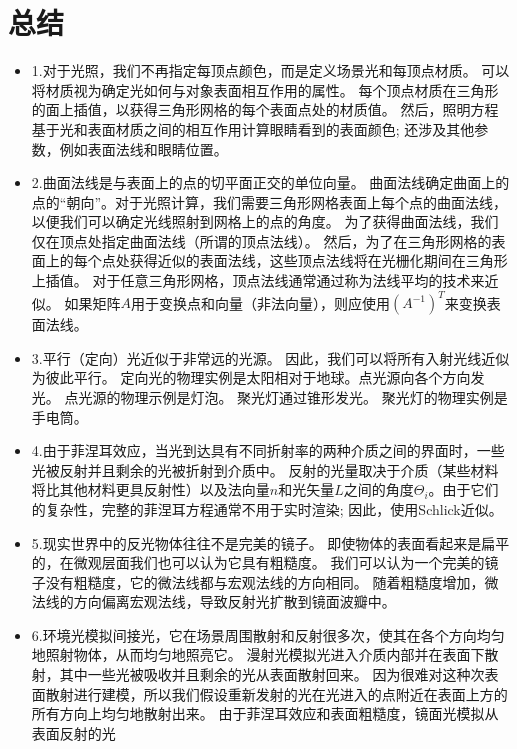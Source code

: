 \section{总结}
\begin{itemize}
  \item 1.对于光照，我们不再指定每顶点颜色，而是定义场景光和每顶点材质。 可以将材质视为确定光如何与对象表面相互作用的属性。 每个顶点材质在三角形的面上插值，以获得三角形网格的每个表面点处的材质值。 然后，照明方程基于光和表面材质之间的相互作用计算眼睛看到的表面颜色; 还涉及其他参数，例如表面法线和眼睛位置。
  \item 2.曲面法线是与表面上的点的切平面正交的单位向量。 曲面法线确定曲面上的点的“朝向”。对于光照计算，我们需要三角形网格表面上每个点的曲面法线，以便我们可以确定光线照射到网格上的点的角度。 为了获得曲面法线，我们仅在顶点处指定曲面法线（所谓的顶点法线）。 然后，为了在三角形网格的表面上的每个点处获得近似的表面法线，这些顶点法线将在光栅化期间在三角形上插值。 对于任意三角形网格，顶点法线通常通过称为法线平均的技术来近似。 如果矩阵$A$用于变换点和向量（非法向量），则应使用$(A^{-1})^{T}$来变换表面法线。
  \item 3.平行（定向）光近似于非常远的光源。 因此，我们可以将所有入射光线近似为彼此平行。 定向光的物理实例是太阳相对于地球。点光源向各个方向发光。 点光源的物理示例是灯泡。 聚光灯通过锥形发光。 聚光灯的物理实例是手电筒。
  \item 4.由于菲涅耳效应，当光到达具有不同折射率的两种介质之间的界面时，一些光被反射并且剩余的光被折射到介质中。 反射的光量取决于介质（某些材料将比其他材料更具反射性）以及法向量$n$和光矢量$L$之间的角度$\Theta_{i}$。由于它们的复杂性，完整的菲涅耳方程通常不用于实时渲染; 因此，使用Schlick近似。
  \item 5.现实世界中的反光物体往往不是完美的镜子。 即使物体的表面看起来是扁平的，在微观层面我们也可以认为它具有粗糙度。 我们可以认为一个完美的镜子没有粗糙度，它的微法线都与宏观法线的方向相同。 随着粗糙度增加，微法线的方向偏离宏观法线，导致反射光扩散到镜面波瓣中。
  \item 6.环境光模拟间接光，它在场景周围散射和反射很多次，使其在各个方向均匀地照射物体，从而均匀地照亮它。 漫射光模拟光进入介质内部并在表面下散射，其中一些光被吸收并且剩余的光从表面散射回来。 因为很难对这种次表面散射进行建模，所以我们假设重新发射的光在光进入的点附近在表面上方的所有方向上均匀地散射出来。 由于菲涅耳效应和表面粗糙度，镜面光模拟从表面反射的光
\end{itemize}

